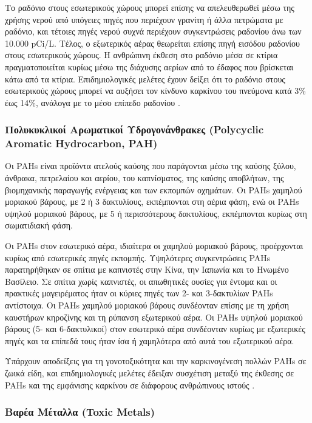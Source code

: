 Το ραδόνιο στους εσωτερικούς χώρους μπορεί επίσης να απελευθερωθεί μέσω της χρήσης νερού από υπόγειες πηγές που περιέχουν γρανίτη ή άλλα πετρώματα με ραδόνιο, και τέτοιες πηγές νερού συχνά περιέχουν συγκεντρώσεις ραδονίου άνω των 10.000 pCi/L.
 Τέλος, ο εξωτερικός αέρας θεωρείται επίσης πηγή εισόδου ραδονίου στους εσωτερικούς χώρους. Η ανθρώπινη έκθεση στο ραδόνιο μέσα σε κτίρια πραγματοποιείται κυρίως μέσω της διάχυσης αερίων από το έδαφος που βρίσκεται κάτω από τα κτίρια. 
 Επιδημιολογικές μελέτες έχουν δείξει ότι το ραδόνιο στους εσωτερικούς χώρους μπορεί να αυξήσει τον κίνδυνο καρκίνου του πνεύμονα κατά 3\% έως 14\%, ανάλογα με το μέσο επίπεδο ραδονίου \cite{ijerph17082927}.

\subsubsection{Πολυκυκλικοί Αρωματικοί Υδρογονάνθρακες (Polycyclic Aromatic Hydrocarbon, PAH)}


Οι PAHs είναι προϊόντα ατελούς καύσης που παράγονται μέσω της καύσης ξύλου, άνθρακα, πετρελαίου και αερίου, του καπνίσματος, της καύσης αποβλήτων, της βιομηχανικής παραγωγής ενέργειας και των εκπομπών οχημάτων. 
Οι PAHs χαμηλού μοριακού βάρους, με 2 ή 3 δακτυλίους, εκπέμπονται στη αέρια φάση, ενώ οι PAHs υψηλού μοριακού βάρους, με 5 ή περισσότερους δακτυλίους, εκπέμπονται κυρίως στη σωματιδιακή φάση.

Οι PAHs στον εσωτερικό αέρα, ιδιαίτερα οι χαμηλού μοριακού βάρους, προέρχονται κυρίως από εσωτερικές πηγές εκπομπής. Υψηλότερες συγκεντρώσεις PAHs παρατηρήθηκαν σε σπίτια με καπνιστές στην Κίνα, την Ιαπωνία και το Ηνωμένο Βασίλειο. 
Σε σπίτια χωρίς καπνιστές, οι απωθητικές ουσίες για έντομα και οι πρακτικές μαγειρέματος ήταν οι κύριες πηγές των 2- και 3-δακτυλίων PAHs αντίστοιχα. Οι PAHs χαμηλού μοριακού βάρους συνδέονταν επίσης με τη χρήση καυστήρων κηροζίνης και τη ρύπανση εξωτερικού αέρα. 
Οι PAHs υψηλού μοριακού βάρους (5- και 6-δακτυλικοί) στον εσωτερικό αέρα συνδέονταν κυρίως με εξωτερικές πηγές και τα επίπεδά τους ήταν ίσα ή χαμηλότερα από αυτά του εξωτερικού αέρα.


Υπάρχουν αποδείξεις για τη γονοτοξικότητα και την καρκινογένεση πολλών PAHs σε ζωικά είδη, και επιδημιολογικές μελέτες έδειξαν συσχέτιση μεταξύ της έκθεσης σε PAHs και της εμφάνισης καρκίνου σε διάφορους ανθρώπινους ιστούς \cite{ijerph17238972}.


 \subsubsection {Βαρέα Μέταλλα (Toxic Metals)}


